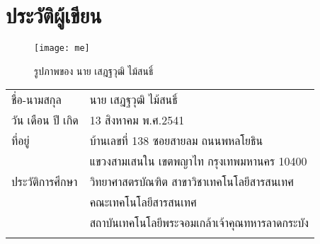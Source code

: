 \chapter{ประวัติผู้เขียน}
\begin{figure}[H]
	\centering
	\texttt{[image: me]}
	\caption{รูปภาพของ นาย เสฎฐวุฒิ ไม้สนธิ์}
	\label{Fig:999}
\end{figure}
\begin{tabularx}{\linewidth}{lX}
	ชื่อ-นามสกุล&นาย เสฎฐวุฒิ ไม้สนธิ์\\
	วัน เดือน ปี เกิด&13 สิงหาคม พ.ศ.2541\\
	ที่อยู่& บ้านเลขที่ 138 ซอยสายลม ถนนพหลโยธิน 
	\\
	&แขวงสามเสนใน เขตพญาไท กรุงเทพมหานคร 10400
	\\
	ประวัติการศึกษา&วิทยาศาสตรบัณฑิต สาขาวิชาเทคโนโลยีสารสนเทศ
	\\
	&คณะเทคโนโลยีสารสนเทศ
	\\
	&สถาบันเทคโนโลยีพระจอมเกล้าเจ้าคุณทหารลาดกระบัง
	\\
	\\
\end{tabularx}